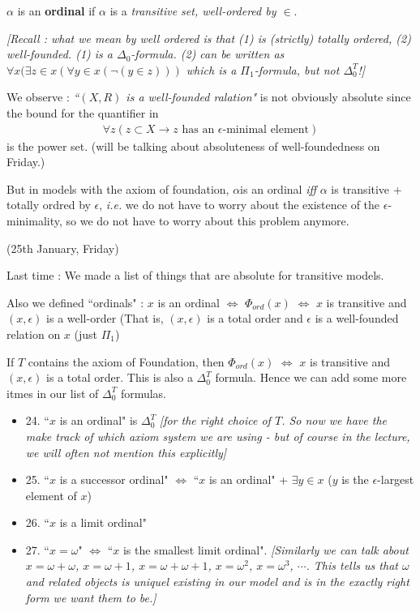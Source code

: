 \documentclass[12pt,a4paper]{article}
\newenvironment{subproof}
{\begin{changemargin}{0.5cm}{0.5cm} 
	}%
	{\end{changemargin}
}
\renewenvironment{i}
{\begin{itemize} 
	}%
	{\end{itemize}
}
\begin{document}
$\alpha$ is an \textbf{ordinal} if $\alpha$ is a \emph{transitive set, well-ordered by $\in$}.
\begin{subproof}
\emph{[Recall : what we mean by well ordered is that (1) is (strictly) totally ordered, (2) well-founded. (1) is a $\Delta_0$-formula. (2) can be written as $\forall x (\exists z\in x(\forall y\in x(\neg(y\in z)))$ which is a $\Pi_1$-formula, but not $\Delta_0^T$!]}

\quad We observe : \emph{``$(X,R)$ is a well-founded ralation"} is not obviously absolute since the bound for the quantifier in
\begin{align*}
\forall z (z\subset X \rightarrow z \text{ has an }\epsilon\text{-minimal element})
\end{align*}
is the power set. (will be talking about absoluteness of well-foundedness on Friday.)

\quad But in models with the axiom of foundation, $\alpha $is an ordinal \emph{iff} $\alpha$ is transitive + totally ordred by $\epsilon$, \textit{i.e.} we do not have to worry about the existence of the $\epsilon$-minimality, so we do not have to worry about this problem anymore.
\end{subproof}
\s

\newday

(25th January, Friday)
\s

Last time : We made a list of things that are absolute for transitive models.

\quad Also we defined ``ordinals" : $x$ is an ordinal $\Leftrightarrow$ $\Phi_{ord}(x)$ $\Leftrightarrow$ $x$ is transitive and $(x, \epsilon)$ is a well-order (That is, $(x, \epsilon)$ is a total order and $\epsilon$ is a well-founded relation on $x$ (just $\Pi_1$)

\quad If $T$ contains the axiom of Foundation, then $\Phi_{ord}(x)$ $\Leftrightarrow$ $x$ is transitive and $(x,\epsilon)$ is a total order. This is also a $\Delta_0^T$ formula. Hence we can add some more itmes in our list of $\Delta_0^T$ formulas.

\begin{i}
\item[24.] ``$x$ is an ordinal" is $\Delta_0^T$ \emph{[for the right choice of $T$. So now we have the make track of which axiom system we are using - but of course in the lecture, we will often not mention this explicitly]}
\item[25.] ``$x$ is a successor ordinal" $\Leftrightarrow$ ``$x$ is an ordinal" + $\exists y\in x$ ($y$ is the $\epsilon$-largest element of $x$)
\item[26.] ``$x$ is a limit ordinal"
\item[27.] ``$x=\omega$" $\Leftrightarrow$ ``$x$ is the smallest limit ordinal". \emph{[Similarly we can talk about $x=\omega + \omega$, $x= \omega +1$, $x= \omega+\omega+1$, $x= \omega^2$, $x= \omega^3$, $\cdots$. This tells us that $\omega$ and related objects is uniquel existing in our model and is in the exactly right form we want them to be.]}
\end{i}
\s
\end{document}
